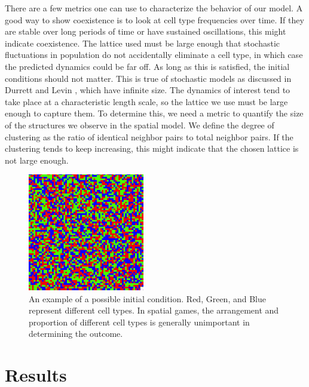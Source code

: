 \documentclass[12pt]{amsart}
\begin{document}
	There are a few metrics one can use to characterize the behavior of our model. A good way to show coexistence is to look at cell type frequencies over time. If they are stable over long periods of time or have sustained oscillations, this might indicate coexistence. The lattice used must be large enough that stochastic fluctuations in population do not accidentally eliminate a cell type, in which case the predicted dynamics could be far off. As long as this is satisfied, the initial conditions should not matter. This is true of stochastic models as discussed in Durrett and Levin \cite{Durrett1994}, which have infinite size. The dynamics of interest tend to take place at a characteristic length scale, so the lattice we use must be large enough to capture them. To determine this, we need a metric to quantify the size of the structures we observe in the spatial model. We define the degree of clustering as the ratio of identical neighbor pairs to total neighbor pairs. If the clustering tends to keep increasing, this might indicate that the chosen lattice is  not large enough.

\begin{figure}[t]
\caption{An example of a possible initial condition. Red, Green, and Blue represent different cell types. In spatial games, the arrangement and proportion of different cell types is generally unimportant in determining the outcome.}
\centering
\includegraphics[width = 2in]{Diagrams/General/even_random_mix}
\end{figure}

\section{Results}
\end{document}
